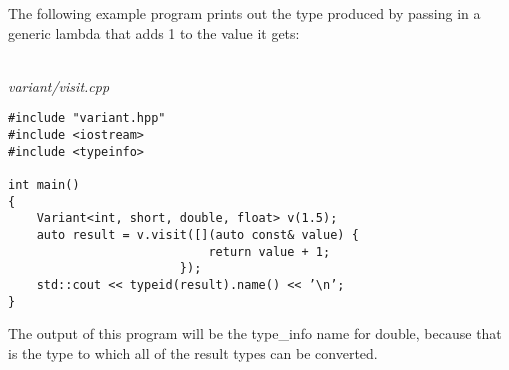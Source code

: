 The following example program prints out the type produced by passing in a generic lambda that adds 1 to the value it gets:

\hspace*{\fill} \\ %
\noindent
\textit{variant/visit.cpp}
\begin{lstlisting}[style=styleCXX]
#include "variant.hpp"
#include <iostream>
#include <typeinfo>

int main()
{
	Variant<int, short, double, float> v(1.5);
	auto result = v.visit([](auto const& value) {
							return value + 1;
						});
	std::cout << typeid(result).name() << ’\n’;
}
\end{lstlisting}

The output of this program will be the type\_info name for double, because that is the type to which all of the result types can be converted.







